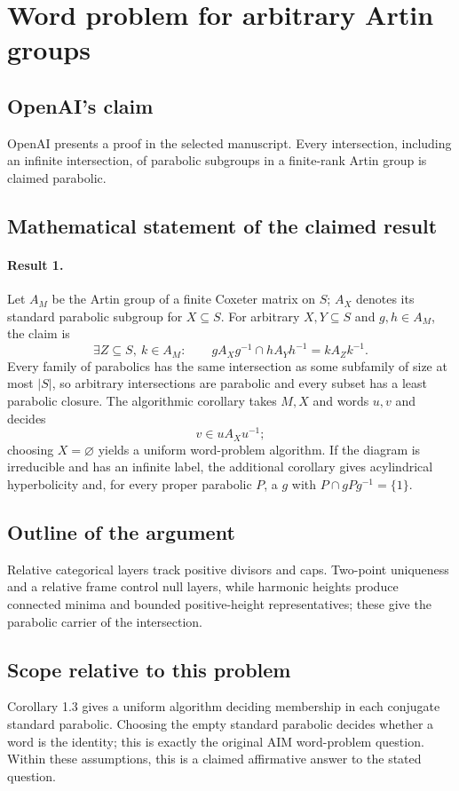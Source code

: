 \documentclass[11pt]{article}
\begin{document}
\section*{Word problem for arbitrary Artin groups}

\subsection{OpenAI's claim}
OpenAI presents a proof in the selected manuscript. Every intersection, including an infinite intersection, of parabolic subgroups in a finite-rank Artin group is claimed parabolic.

\subsection{Mathematical statement of the claimed result}
\paragraph{Result 1.} Let \(A_M\) be the Artin group of a finite Coxeter matrix on \(S\); \(A_X\) denotes its standard parabolic subgroup for \(X\subseteq S\). For arbitrary \(X,Y\subseteq S\) and \(g,h\in A_M\), the claim is
\[
 \exists Z\subseteq S,\ k\in A_M:\qquad
 gA_Xg^{-1}\cap hA_Yh^{-1}=kA_Zk^{-1}.
\]
Every family of parabolics has the same intersection as some subfamily of size at most \(|S|\), so arbitrary intersections are parabolic and every subset has a least parabolic closure. The algorithmic corollary takes \(M,X\) and words \(u,v\) and decides
\[
 v\in uA_Xu^{-1};
\]
choosing \(X=\varnothing\) yields a uniform word-problem algorithm. If the diagram is irreducible and has an infinite label, the additional corollary gives acylindrical hyperbolicity and, for every proper parabolic \(P\), a \(g\) with \(P\cap gPg^{-1}=\{1\}\).

\subsection{Outline of the argument}
Relative categorical layers track positive divisors and caps. Two-point uniqueness and a relative frame control null layers, while harmonic heights produce connected minima and bounded positive-height representatives; these give the parabolic carrier of the intersection.

\subsection{Scope relative to this problem}
Corollary 1.3 gives a uniform algorithm deciding membership in each conjugate standard parabolic. Choosing the empty standard parabolic decides whether a word is the identity; this is exactly the original AIM word-problem question. Within these assumptions, this is a claimed affirmative answer to the stated question.
\end{document}
